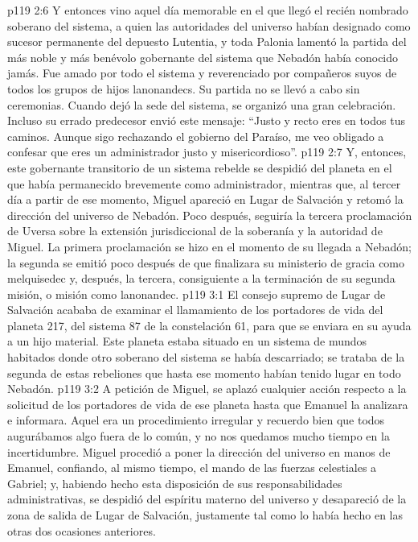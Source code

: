 \vs p119 2:6 \pc Y entonces vino aquel día memorable en el que llegó el recién nombrado soberano del sistema, a quien las autoridades del universo habían designado como sucesor permanente del depuesto Lutentia, y toda Palonia lamentó la partida del más noble y más benévolo gobernante del sistema que Nebadón había conocido jamás. Fue amado por todo el sistema y reverenciado por compañeros suyos de todos los grupos de hijos lanonandecs. Su partida no se llevó a cabo sin ceremonias. Cuando dejó la sede del sistema, se organizó una gran celebración. Incluso su errado predecesor envió este mensaje: “Justo y recto eres en todos tus caminos. Aunque sigo rechazando el gobierno del Paraíso, me veo obligado a confesar que eres un administrador justo y misericordioso”.
\vs p119 2:7 Y, entonces, este gobernante transitorio de un sistema rebelde se despidió del planeta en el que había permanecido brevemente como administrador, mientras que, al tercer día a partir de ese momento, Miguel apareció en Lugar de Salvación y retomó la dirección del universo de Nebadón. Poco después, seguiría la tercera proclamación de Uversa sobre la extensión jurisdiccional de la soberanía y la autoridad de Miguel. La primera proclamación se hizo en el momento de su llegada a Nebadón; la segunda se emitió poco después de que finalizara su ministerio de gracia como melquisedec y, después, la tercera, consiguiente a la terminación de su segunda misión, o misión como lanonandec.
\vs p119 3:1 El consejo supremo de Lugar de Salvación acababa de examinar el llamamiento de los portadores de vida del planeta 217, del sistema 87 de la constelación 61, para que se enviara en su ayuda a un hijo material. Este planeta estaba situado en un sistema de mundos habitados donde otro soberano del sistema se había descarriado; se trataba de la segunda de estas rebeliones que hasta ese momento habían tenido lugar en todo Nebadón.
\vs p119 3:2 A petición de Miguel, se aplazó cualquier acción respecto a la solicitud de los portadores de vida de ese planeta hasta que Emanuel la analizara e informara. Aquel era un procedimiento irregular y recuerdo bien que todos augurábamos algo fuera de lo común, y no nos quedamos mucho tiempo en la incertidumbre. Miguel procedió a poner la dirección del universo en manos de Emanuel, confiando, al mismo tiempo, el mando de las fuerzas celestiales a Gabriel; y, habiendo hecho esta disposición de sus responsabilidades administrativas, se despidió del espíritu materno del universo y desapareció de la zona de salida de Lugar de Salvación, justamente tal como lo había hecho en las otras dos ocasiones anteriores.
